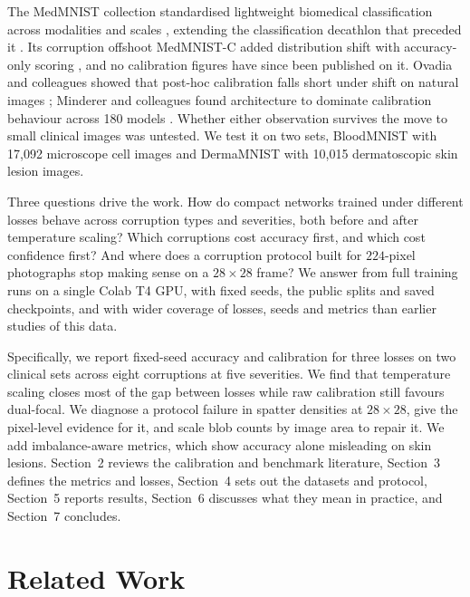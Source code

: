 \documentclass[a4paper,11pt,en,citestyle=authoryear,bibstyle=authoryear]{elegantpaper}
\begin{document}
The MedMNIST collection standardised lightweight biomedical classification across modalities and scales \parencite{medmnist2023}, extending the classification decathlon that preceded it \parencite{medmnist2021}. Its corruption offshoot MedMNIST-C added distribution shift with accuracy-only scoring \parencite{medmnistc2024}, and no calibration figures have since been published on it. Ovadia and colleagues showed that post-hoc calibration falls short under shift on natural images \parencite{ovadia2019}; Minderer and colleagues found architecture to dominate calibration behaviour across 180 models \parencite{minderer2021}. Whether either observation survives the move to small clinical images was untested. We test it on two sets, BloodMNIST with 17,092 microscope cell images and DermaMNIST with 10,015 dermatoscopic skin lesion images.

Three questions drive the work. How do compact networks trained under different losses behave across corruption types and severities, both before and after temperature scaling? Which corruptions cost accuracy first, and which cost confidence first? And where does a corruption protocol built for $224$-pixel photographs stop making sense on a $28\times28$ frame? We answer from full training runs on a single Colab T4 GPU, with fixed seeds, the public splits and saved checkpoints, and with wider coverage of losses, seeds and metrics than earlier studies of this data.

Specifically, we report fixed-seed accuracy and calibration for three losses on two clinical sets across eight corruptions at five severities. We find that temperature scaling closes most of the gap between losses while raw calibration still favours dual-focal. We diagnose a protocol failure in spatter densities at $28\times28$, give the pixel-level evidence for it, and scale blob counts by image area to repair it. We add imbalance-aware metrics, which show accuracy alone misleading on skin lesions. Section~2 reviews the calibration and benchmark literature, Section~3 defines the metrics and losses, Section~4 sets out the datasets and protocol, Section~5 reports results, Section~6 discusses what they mean in practice, and Section~7 concludes.

\section{Related Work}
\end{document}
